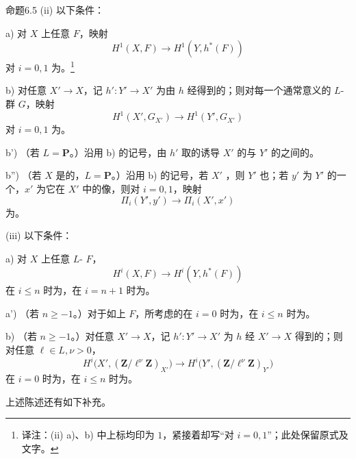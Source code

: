 \begin{SGAresult}{命题}{6.5}
(ii) 以下条件：

 a) 对 $X$ 上任意 $F$，映射
\[
H^1(X,F)\longrightarrow H^1(Y,h^*(F))
\]
对 $i=0,1$ 为。\footnote{译注：(ii) a)、b) 中上标均印为 $1$，紧接着却写“对 $i=0,1$”；此处保留原式及文字。}

 b) 对任意 $X'\to X$，记 $h':Y'\to X'$ 为由 $h$ 经得到的；则对每一个通常意义的 $L$-群 $G$，映射
\[
H^1(X',G_{X'})\longrightarrow H^1(Y',G_{X'})
\]
对 $i=0,1$ 为。

 b') （若 $L=\mathbf P$。）沿用 b) 的记号，由 $h'$ 取的诱导 $X'$ 的与 $Y'$ 的之间的。

 b'') （若 $X$ 是的，$L=\mathbf P$。）沿用 b) 的记号，若 $X'$ ，则 $Y'$ 也；若 $y'$ 为 $Y'$ 的一个，$x'$ 为它在 $X'$ 中的像，则对 $i=0,1$，映射
\[
\Pi_i(Y',y')\longrightarrow\Pi_i(X',x')
\]
为。

(iii) 以下条件：

 a) 对 $X$ 上任意 $L$- $F$，
\[
H^i(X,F)\longrightarrow H^i(Y,h^*(F))
\]
在 $i\leq n$ 时为，在 $i=n+1$ 时为。

 a') （若 $n\geq-1$。）对于如上 $F$，所考虑的在 $i=0$ 时为，在 $i\leq n$ 时为。

 b) （若 $n\geq-1$。）对任意 $X'\to X$，记 $h':Y'\to X'$ 为 $h$ 经 $X'\to X$ 得到的；则对任意 $\ell\in L,\nu>0$，
\[
H^i\bigl(X',(\mathbf Z/\ell^\nu\mathbf Z)_{X'}\bigr)
\longrightarrow H^i\bigl(Y',(\mathbf Z/\ell^\nu\mathbf Z)_{Y'}\bigr)
\]
在 $i=0$ 时为，在 $i\leq n$ 时为。
\end{SGAresult}
上述陈述还有如下补充。

